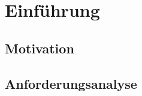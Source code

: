 \chapter{Einführung}

\blindtext

\section{Motivation}

\blindtext

\section{Anforderungsanalyse}

\blindtext
